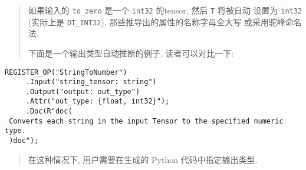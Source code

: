\begin{Shaded}
\begin{Highlighting}[]
 \OperatorTok{=}\NormalTok{):}

\end{Highlighting}
\end{Shaded}

\begin{quote}
如果输入的 \texttt{to\_zero} 是一个 \texttt{int32} 的tensor, 然后
\texttt{T} 将被自动 设置为 \texttt{int32} (实际上是 \texttt{DT\_INT32}).
那些推导出的属性的名称字母全大写 或采用驼峰命名法.

下面是一个输出类型自动推断的例子, 读者可以对比一下:
\end{quote}

\begin{verbatim}
REGISTER_OP("StringToNumber")
     .Input("string_tensor: string")
     .Output("output: out_type")
     .Attr("out_type: {float, int32}");
     .Doc(R"doc(
 Converts each string in the input Tensor to the specified numeric type.
 )doc");
\end{verbatim}

\begin{quote}
在这种情况下, 用户需要在生成的 Python 代码中指定输出类型.
\end{quote}

\begin{Shaded}
\begin{Highlighting}[]
 \OperatorTok{=}\OperatorTok{=}\NormalTok{):}


\end{Highlighting}
\end{Shaded}

